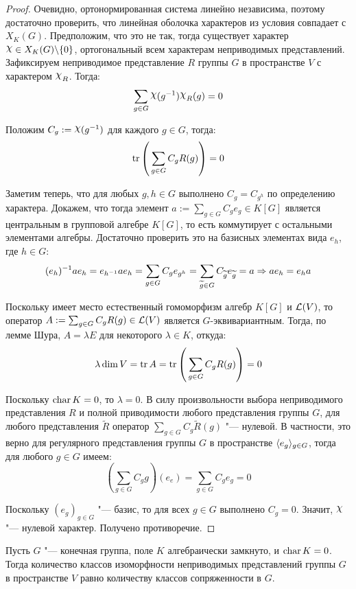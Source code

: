 \begin{proof}
	Очевидно, ортонормированная система линейно независима, поэтому достаточно проверить, что линейная оболочка характеров из условия совпадает с $X_K(G)$. Предположим, что это не так, тогда существует характер $\Chi \in X_K(G)\bs\{0\}$, ортогональный всем характерам неприводимых представлений. Зафиксируем неприводимое представление $R$ группы $G$ в пространстве $V$ с характером $\Chi_R$. Тогда:
	\[\sum_{g \in G}\Chi{(g^{-1})}\Chi_R(g) = 0\]
	
	Положим $C_g := \Chi(g^{-1})$ для каждого $g \in G$, тогда:
	\[\operatorname{tr}\left(\,\sum_{g \in G}C_g R(g)\right) = 0\]
	
	Заметим теперь, что для любых $g, h \in G$ выполнено $C_{g} = C_{g^h}$ по определению характера. Докажем, что тогда элемент $a := \sum_{g \in G}C_ge_g \in K[G]$ является центральным в групповой алгебре $K[G]$, то есть коммутирует с остальными элементами алгебры. Достаточно проверить это на базисных элементах вида $e_h$, где $h \in G$:
	\[(e_{h})^{-1}ae_h = e_{h^{-1}}ae_h = \sum_{g \in G}C_ge_{g^h} = \sum_{\widetilde g \in G}C_{\widetilde g}e_{\widetilde g} = a \Rightarrow ae_h = e_ha\]
	
	Поскольку имеет место естественный гомоморфизм алгебр $K[G]$ и $\mathcal L(V)$, то оператор $A := \sum_{g \in G}C_gR(g) \in \mathcal L(V)$ является $G$-эквивариантным. Тогда, по лемме Шура, $A = \lambda E$ для некоторого $\lambda \in K$, откуда:
	\[\lambda\dim{V} = \operatorname{tr}{A} = \operatorname{tr}\left(\,\sum_{g \in G}C_gR(g)\right) = 0\]
	
	Поскольку $\operatorname{char}{K} = 0$, то $\lambda = 0$. В силу произвольности выбора неприводимого представления $R$ и полной приводимости любого представления группы $G$, для любого представления $\widetilde R$ оператор $\sum_{g \in G}C_g\widetilde R(g)$ "--- нулевой. В частности, это верно для регулярного представления группы $G$ в пространстве $\langle e_g \rangle_{g \in G}$, тогда для любого $g \in G$ имеем:
	\[\left(\sum_{g \in G}C_gg\right)(e_e) = \sum_{g \in G}C_ge_g = 0\]
	
	Поскольку $(e_g)_{g \in G}$ "--- базис, то для всех $g \in G$ выполнено $C_g = 0$. Значит, $\Chi$ "--- нулевой характер. Получено противоречие.	
\end{proof}

\begin{corollary}
	Пусть $G$ "--- конечная группа, поле $K$ алгебраически замкнуто, и $\operatorname{char}{K} = 0$. Тогда количество классов изоморфности неприводимых представлений группы $G$ в пространстве $V$ равно количеству классов сопряженности в $G$.
\end{corollary}

